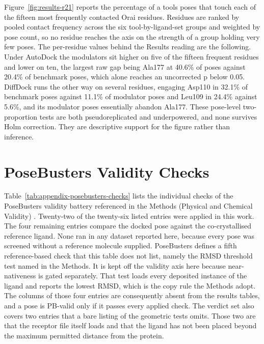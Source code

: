 Figure~\ref{fig:results-r21} reports the percentage of a tool\textquotesingle s poses that touch each of the fifteen most frequently contacted Orai residues. Residues are ranked by pooled contact frequency across the six tool-by-ligand-set groups and weighted by pose count, so no residue reaches the axis on the strength of a group holding very few poses. The per-residue values behind the Results reading are the following. Under AutoDock the modulators sit higher on five of the fifteen frequent residues and lower on ten, the largest raw gap being Ala177 at 40.6\% of poses against 20.4\% of benchmark poses, which alone reaches an uncorrected p below 0.05. DiffDock runs the other way on several residues, engaging Asp110 in 32.1\% of benchmark poses against 11.1\% of modulator poses and Leu109 in 24.4\% against 5.6\%, and its modulator poses essentially abandon Ala177. These pose-level two-proportion tests are both pseudoreplicated and underpowered, and none survives Holm correction. They are descriptive support for the figure rather than inference.

\hypertarget{posebusters-validity-checks}{%
\section{PoseBusters Validity Checks}\label{posebusters-validity-checks}}

Table~\ref{tab:appendix-posebusters-checks} lists the individual checks of the PoseBusters validity battery referenced in the Methods (Physical and Chemical Validity) \cite{ref035}. Twenty-two of the twenty-six listed entries were applied in this work. The four remaining entries compare the docked pose against the co-crystallised reference ligand. None ran in any dataset reported here, because every pose was screened without a reference molecule supplied. PoseBusters defines a fifth reference-based check that this table does not list, namely the RMSD threshold test named in the Methods. It is kept off the validity axis here because near-nativeness is gated separately. That test loads every deposited instance of the ligand and reports the lowest RMSD, which is the copy rule the Methods adopt. The columns of those four entries are consequently absent from the results tables, and a pose is PB-valid only if it passes every applied check. The verdict set also covers two entries that a bare listing of the geometric tests omits. Those two are that the receptor file itself loads and that the ligand has not been placed beyond the maximum permitted distance from the protein.

